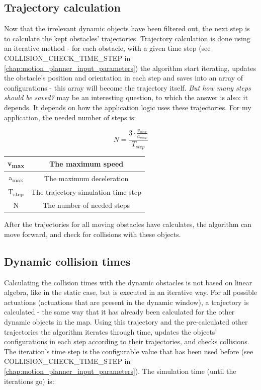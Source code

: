 \subsection{Trajectory calculation}
\label{trajectory_calculation}
Now that the irrelevant dynamic objects have been filtered out, the next step is to calculate the kept obstacles' trajectories. Trajectory calculation is done using an iterative method - for each obstacle, with a given time step (see COLLISION\_CHECK\_TIME\_STEP in \ref{chap:motion_planner_input_parameters}) the algorithm start iterating, updates the obstacle's position and orientation in each step and saves into an array of configurations - this array will become the trajectory itself. \textit{But how many steps should be saved?} may be an interesting question, to which the answer is also: it depends. It depends on how the application logic uses these trajectories. For my application, the needed number of steps is:

\[ N = \frac{3 \cdot \frac{v_{max}}{a_{max}}}{T_{step}} \]

\begin{center}
    \begin{tabular}{ | c | c | }
        \hline
        v\textsubscript{max}	& The maximum speed    					\\
        \hline
        a\textsubscript{max}  	& The maximum deceleration      		\\
        \hline
        T\textsubscript{step}  	& The trajectory simulation time step	\\
        \hline
        N  						& The number of needed steps			\\
        \hline
    \end{tabular}
\end{center}

After the trajectories for all moving obstacles have calculates, the algorithm can move forward, and check for collisions with these objects.

\subsection{Dynamic collision times}
Calculating the collision times with the dynamic obstacles is not based on linear algebra, like in the static case, but is executed in an iterative way. For all possible actuations (actuations that are present in the dynamic window), a trajectory is calculated - the same way that it has already been calculated for the other dynamic objects in the map. Using this trajectory and the pre-calculated other trajectories the algorithm iterates through time, updates the objects' configurations in each step according to their trajectories, and checks collisions. The iteration's time step is the configurable value that has been used before (see COLLISION\_CHECK\_TIME\_STEP in \ref{chap:motion_planner_input_parameters}). The simulation time (until the iterations go) is:


